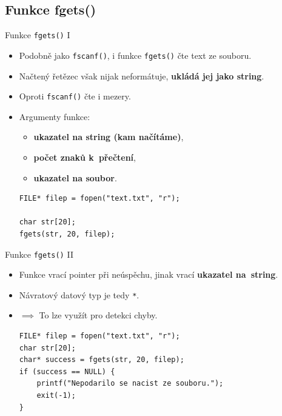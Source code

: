 \documentclass[14pt,aspectratio=169]{beamer}
\begin{document}
    \subsection{Funkce fgets()}
    \begin{frame}[t,fragile]{Funkce \texttt{fgets()} \textrm{I}}
        \begin{itemize}
            \item Podobně jako \texttt{fscanf()}, i funkce \texttt{fgets()} čte text ze souboru.
            \item Načtený řetězec však nijak neformátuje, \textbf{ukládá jej jako string}.
            \item Oproti \texttt{fscanf()} čte i mezery.
            \item Argumenty funkce:
            \begin{itemize}
                \item \textbf{ukazatel na string (kam načítáme)},
                \item \textbf{počet znaků k~přečtení},
                \item \textbf{ukazatel na soubor}.
            \end{itemize}
            \begin{lstlisting}
FILE* filep = fopen("text.txt", "r");

char str[20];
fgets(str, 20, filep);
            \end{lstlisting}
        \end{itemize}
    \end{frame}

    \begin{frame}[t,fragile]{Funkce \texttt{fgets()} \textrm{II}}
        \begin{itemize}
            \item Funkce vrací \texttt{} pointer při neúspěchu, jinak vrací \textbf{ukazatel na~string}.
            \item Návratový datový typ je tedy \texttt{*}.
            \item $\implies$ To lze využít pro detekci chyby.
            \begin{lstlisting}
FILE* filep = fopen("text.txt", "r");
char str[20];
char* success = fgets(str, 20, filep);
if (success == NULL) {
    printf("Nepodarilo se nacist ze souboru.");
    exit(-1);
}
            \end{lstlisting}
        \end{itemize}
    \end{frame}
\end{document}
